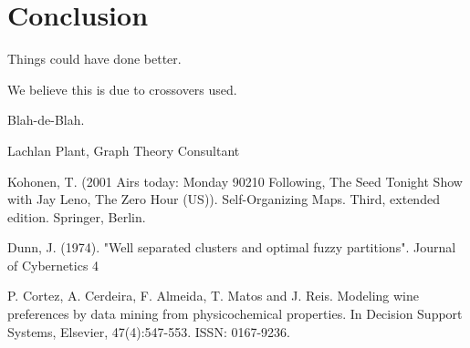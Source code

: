 \documentclass[journal]{IEEEtran}
\begin{document}
\section{Conclusion}
Things could have done better.

We believe this is due to crossovers used.

Blah-de-Blah.





\begin{thebibliography}{1}

Lachlan Plant, Graph Theory Consultant

Kohonen, T. (2001
Airs today: Monday
     90210
     Following, The
     Seed
     Tonight Show with Jay Leno, The
     Zero Hour (US)). Self-Organizing Maps. Third, extended edition. Springer, Berlin.

Dunn, J. (1974). "Well separated clusters and optimal fuzzy partitions". Journal of Cybernetics 4

  P. Cortez, A. Cerdeira, F. Almeida, T. Matos and J. Reis. 
  Modeling wine preferences by data mining from physicochemical properties.
  In Decision Support Systems, Elsevier, 47(4):547-553. ISSN: 0167-9236.

\end{thebibliography}


\end{document}
